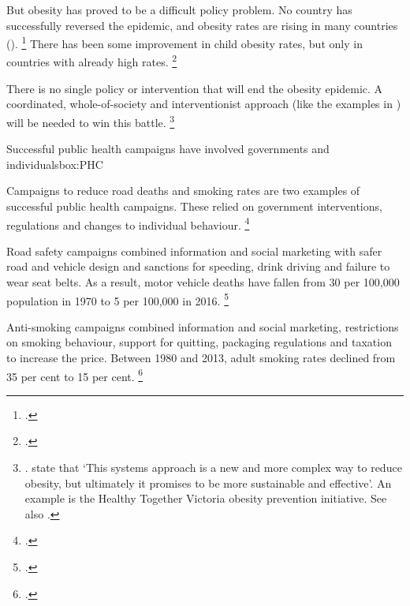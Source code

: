 \documentclass[embargoed]{grattan}
\begin{document}
\begin{table}
\caption{Commonwealth Government obesity/preventive health reports and committees}\label{tbl:Health-campaigns}



\end{table}


But obesity has proved to be a difficult policy problem.
No country has successfully reversed the epidemic, and obesity rates are rising in many countries ().%
\footcites{Australia2015NoTimeWeight}{Roberto2015Patchyprogressobesity}{Swinburn2004Dietnutritionprevention} There has been some improvement in child obesity rates, but only in countries with already high rates.%
\footcite{Roberto2015Patchyprogressobesity}

There is no single policy or intervention that will end the obesity epidemic.
A coordinated, whole-of-society and interventionist approach (like the examples in ) will be needed to win this battle.%
\footnote{\textcites{Sassi2016Taxingsugar}{Karnani2016ObesityCrisisas}{Huang2009systemsorientedmultilevel}. \textcite{Swinburn2013Progressobesityprevention} state that `This systems approach is a new and more complex way to reduce obesity, but ultimately it promises to be more sustainable and effective'.
An example is the Healthy Together Victoria obesity prevention initiative.
See also \textcites{Mckinsey2014overcomingobesity}{Health2016Insufficientphysicalactivity}.}

\begin{smallbox}{Successful public health campaigns have involved governments and individuals}{box:PHC}

Campaigns to reduce road deaths and smoking rates are two examples of successful public health campaigns.
These relied on government interventions, regulations and changes to individual behaviour.%
\footcite{MacKay2011Legislativesolutionsunhealthy}

Road safety campaigns combined information and social marketing with safer road and vehicle design and sanctions for speeding, drink driving and failure to wear seat belts.
As a result, motor vehicle deaths have fallen from 30 per 100,000 population in 1970 to 5 per 100,000 in 2016.%
\footcites{BITRE2016Roaddeaths}{BITRE2010RoaddeathsAustralia}

Anti-smoking campaigns combined information and social marketing, restrictions on smoking behaviour, support for quitting, packaging regulations and taxation to increase the price.
Between 1980 and 2013, adult smoking rates declined from 35 per cent to 15 per cent.%
\footcite{Scollo2016TobaccoAustraliaFacts}
\end{smallbox}
\end{document}

